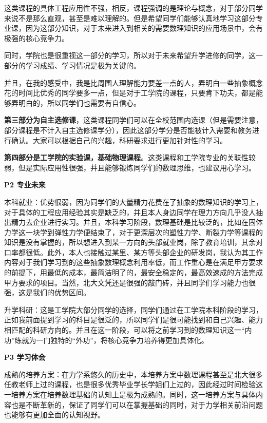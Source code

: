 \documentclass[11pt,oneside]{book}
\begin{document}
这类课程的具体工程应用性不强，相反，课程强调的是理论与概念，对于部分同学来说不是那么直观，甚至是难以理解的。但是希望同学们能够认真地学习这部分专业课，因为这部分知识，对于未来进入到相关的需要数理知识的应用场景中，会有极强的核心竞争力。

同时，学院也是很重视这一部分的学习，所以对于未来希望升学进修的同学，这一部分的学习成绩、学习情况是极为关键的。

并且，在我的感受中，我是比周围人理解能力要差一点的人，弄明白一些抽象概念花的时间比优秀的同学要多一点，但是对于工学院的课程，只要肯下功夫，都是能够弄明白的，所以同学们也需要有自信心。

\textbf{第三部分为自主选修课}，这类课程同学们可以在全校范围内选课（但是需要注意，部分课程是不计入自主选修课学分），因此这部分学分是否能被计入需要和教务进行确认。大家可以根据自己的兴趣，科研要求进行更加针对性的学习。

\textbf{第四部分是工学院的实验课，基础物理课程}。这类课程和工学院专业的关联性较弱，但是实际应用性很强，并且能够锻炼同学们的数理思维，也建议用心学习。

\textbf{P2 专业未来}

本科就业：优势很弱，因为同学们的大量精力花费在了抽象的数理知识的学习上，对于具体的工程应用经验其实是缺乏的，并且本人身边同学在理力方向几乎没人抽出精力去企业进行实习。并且，本科学习阶段，数理基础是比较泛的，比如在固体力学这一块学到弹性力学便结束了，对于更深层次的塑性力学、断裂力学等课程的知识是没有掌握的，所以想进入到某一方向的头部就业岗，除了教育培训，其余对口率都很低。此外，本人也接触过某里、某方等头部企业的研发岗，我认为其工作内容对于我们学习到的这些抽象数理概念利用率低，而工作重心是在满足甲方要求的前提下，用最低的成本，最简洁明了的，最安全稳定的，最高效速成的方法完成甲方要求的项目。当然，北大文凭还是很强的敲门砖，并且同学们学习能力也很强，这是我们的优势区间。

升学科研：这是工学院大部分同学的选择，同学们通过在工学院本科阶段的学习，正如我前面提到学习的科目是很泛的，所以同学们是很可能找到和自己兴趣、能力相匹配的科研方向的。并且在这一阶段，可以将之前学习到的数理知识这一“内功”练就为一门独特的“外功”，将核心竞争力培养得更加具体化。
 
\textbf{P3 学习体会}

成熟的培养方案：在力学系悠久的历史中，本培养方案中数理课程甚至是北大很多任教老师上过的课程，也是很多优秀毕业学长学姐们上过的，因此经过时间检验这一培养方案在培养数理基础的认知上是极为成熟的。同时，这一培养方案与具体内容也是不断革新的，保证了同学们可以在掌握基础的同时，对于力学相关前沿问题也能够有更加全面的认知视野。
\end{document}
